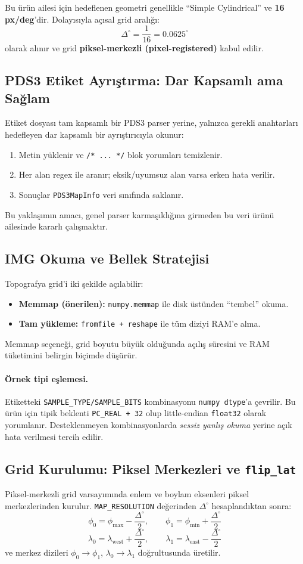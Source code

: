 Bu ürün ailesi için hedeflenen geometri genellikle ``Simple Cylindrical'' ve \textbf{16 px/deg}’dir. Dolayısıyla açısal grid aralığı:
\[
\Delta^\circ = \frac{1}{16} = 0.0625^\circ
\]
olarak alınır ve grid \textbf{piksel-merkezli (pixel-registered)} kabul edilir.

\subsection*{PDS3 Etiket Ayrıştırma: Dar Kapsamlı ama Sağlam}
Etiket dosyası tam kapsamlı bir PDS3 parser yerine, yalnızca gerekli anahtarları hedefleyen
dar kapsamlı bir ayrıştırıcıyla okunur:
\begin{enumerate}
  \item Metin yüklenir ve \texttt{/* ... */} blok yorumları temizlenir.
  \item Her alan regex ile aranır; eksik/uyumsuz alan varsa erken hata verilir.
  \item Sonuçlar \texttt{PDS3MapInfo} veri sınıfında saklanır.
\end{enumerate}
Bu yaklaşımın amacı, genel parser karmaşıklığına girmeden bu veri ürünü ailesinde kararlı çalışmaktır.

\subsection*{IMG Okuma ve Bellek Stratejisi}
Topografya grid’i iki şekilde açılabilir:
\begin{itemize}
  \item \textbf{Memmap (önerilen):} \texttt{numpy.memmap} ile disk üstünden ``tembel'' okuma.
  \item \textbf{Tam yükleme:} \texttt{fromfile + reshape} ile tüm diziyi RAM’e alma.
\end{itemize}
Memmap seçeneği, grid boyutu büyük olduğunda açılış süresini ve RAM tüketimini belirgin biçimde düşürür.

\paragraph{Örnek tipi eşlemesi.}
Etiketteki \texttt{SAMPLE\_TYPE/SAMPLE\_BITS} kombinasyonu \texttt{numpy dtype}’a çevrilir.
Bu ürün için tipik beklenti \texttt{PC\_REAL + 32} olup little-endian \texttt{float32} olarak yorumlanır.
Desteklenmeyen kombinasyonlarda \emph{sessiz yanlış okuma} yerine açık hata verilmesi tercih edilir.

\subsection*{Grid Kurulumu: Piksel Merkezleri ve \texttt{flip\_lat}}
Piksel-merkezli grid varsayımında enlem ve boylam eksenleri piksel merkezlerinden kurulur.
\texttt{MAP\_RESOLUTION} değerinden \(\Delta^\circ\) hesaplandıktan sonra:
\[
\phi_0 = \phi_{\max} - \frac{\Delta^\circ}{2},\qquad
\phi_1 = \phi_{\min} + \frac{\Delta^\circ}{2}
\]
\[
\lambda_0 = \lambda_{\text{west}} + \frac{\Delta^\circ}{2},\qquad
\lambda_1 = \lambda_{\text{east}} - \frac{\Delta^\circ}{2}
\]
ve merkez dizileri \(\phi_0 \to \phi_1\), \(\lambda_0 \to \lambda_1\) doğrultusunda üretilir.

